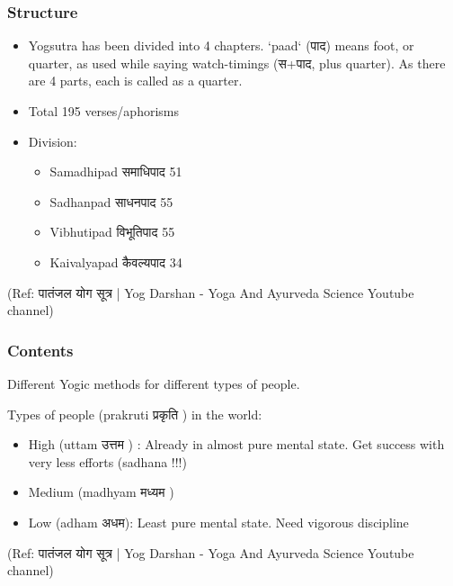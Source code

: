 \begin{frame}[fragile]\frametitle{Structure}

	\begin{itemize}
	\item Yogsutra has been divided into 4 chapters. `paad` (पाद) means foot, or quarter, as used while saying watch-timings (स+पाद, plus quarter). As there are 4 parts, each is called as a quarter.
	\item Total 195 verses/aphorisms
	\item Division:
		\begin{itemize}
		\item Samadhipad समाधिपाद 51
		\item Sadhanpad साधनपाद 55
		\item Vibhutipad विभूतिपाद 55
		\item Kaivalyapad कैवल्यपाद 34
		\end{itemize}	
	\end{itemize}

\tiny{(Ref: पातंजल योग सूत्र | Yog Darshan - Yoga And Ayurveda Science Youtube channel)}

\end{frame}

\begin{frame}[fragile]\frametitle{Contents}

Different Yogic methods for different types of people.

Types of people (prakruti प्रकृति ) in the world:

	\begin{itemize}
	\item High (uttam उत्तम ) : Already in almost pure mental state. Get success with very less efforts (sadhana !!!) 
	\item Medium (madhyam मध्यम )
	\item Low (adham अधम): Least pure mental state. Need vigorous discipline
	\end{itemize}
	
\tiny{(Ref: पातंजल योग सूत्र | Yog Darshan - Yoga And Ayurveda Science Youtube channel)}

\end{frame}

